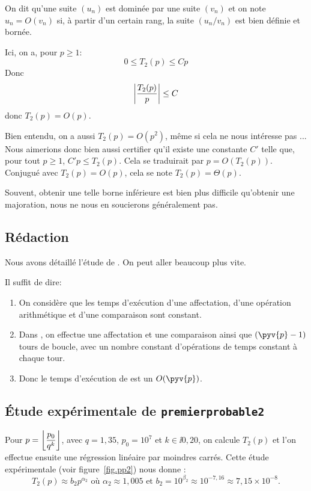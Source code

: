 \begin{defi}
  On dit qu'une suite $(u_{n})$ est dominée par une suite $(v_{n})$ et
  on note $u_{n} = O(v_{n})$ si,  à partir d'un certain rang, la suite
  $(u_{n}/v_{n})$ est bien définie et bornée.  
\end{defi}

Ici, on a, pour $p\geq 1$:
\begin{equation*}
  0 \leq T_{2}(p) \leq C p
\end{equation*}
Donc
\begin{equation*}
  \left|\frac{T_{2}(p)}{p}\right| \leq C
\end{equation*}
donc $T_{2}(p)=O(p)$.

\begin{rem}
  Bien entendu, on a aussi $T_2(p) = O(p^2)$, même si cela ne nous intéresse pas ... Nous aimerions donc bien aussi certifier qu'il existe une constante $C'$ telle que, pour tout $p\geq 1$, $C'p \leq T_2(p)$. 
  Cela se traduirait par $p = O(T_2(p))$. Conjugué avec $T_2(p) = O(p)$, cela se note $T_2(p) =\Theta(p)$. 
  
  Souvent, obtenir une telle borne inférieure est bien plus difficile qu'obtenir une majoration, nous ne nous en soucierons généralement pas. 
\end{rem}


\subsection{Rédaction}
Nous avons détaillé l'étude de . On peut aller
beaucoup plus vite.

Il suffit de dire:

\begin{enumerate}
\item On considère que les temps d'exécution d'une affectation, d'une
  opération arithmétique et d'une comparaison sont constant.
\item Dans , on effectue une affectation et
  une comparaison ainsi que $(\pyv{p}-1)$ tours de boucle, avec un
  nombre constant d'opérations de temps constant à chaque tour.
\item Donc le temps d'exécution de  est un
  $O(\pyv{p})$.
\end{enumerate}

\subsection{Étude expérimentale de \texttt{premierprobable2}}
  Pour $p = \left\lfloor\dfrac{p_0}{q^k}\right\rfloor$, avec $q = 1,35$, $p_0 = 10^7$ et $k\in\ii{0,20}$, on calcule $T_2(p)$ et l'on effectue ensuite une régression linéaire par moindres carrés. Cette étude expérimentale (voir figure~\ref{fig.pp2}) nous donne :
\begin{equation*}
  T_{2}(p)\approx b_{2} p^{\alpha_{2}}
  \text{ où }\alpha_{2}\approx 1,005
  \text{ et }b_{2} = 10^{\beta_{2}} \approx 10^{-7,16}\approx 7,15\times 10^{-8}.
\end{equation*}

